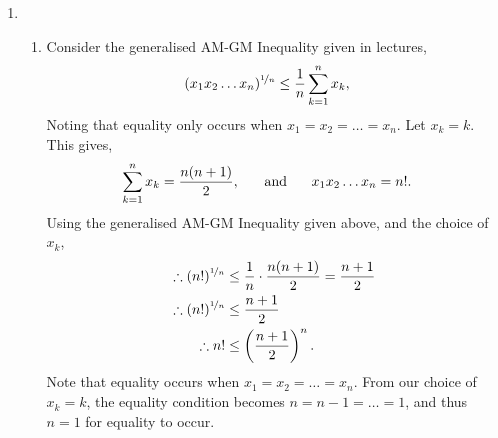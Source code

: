 \documentclass[a4paper,11pt]{article}
\newcommand{\ds}{\displaystyle}
\begin{document}
{{\begin{enumerate}[leftmargin=*]
\begin{enumerate}
				\item We have $\ds{f(x) \sim g(x)}$ as $\ds{x \rightarrow a}$, so 
					\begin{align*}
						\lim_{x \to a} \frac{f(x)}{g(x)} & = 1.
					\end{align*}
					Also, $\ds{h(x) = o(g(x)}$ as $\ds{x \rightarrow a}$, so
					\begin{align*}
						\lim_{x \to a} \frac{f(x)}{g(x)} & = 0.
					\end{align*}
					Considering the above two limits, we have
					\begin{align*}
						\lim_{x \to a}\left(\frac{f(x) + h(x)}{g(x)}\right) & = \lim_{x \to a}\left(\frac{f(x)}{g(x)} + \frac{h(x)}{g(x)}\right) = 1 + 0 = 0\\
					\end{align*}
					By definition, $\ds{f(x) + h(x) \sim g(x)}$.
					\bigbreak

				\item Consider $\ds{f(x) = x^3 + x^2 = O(x^4 + x)}$ and $\ds{g(x) = x^3 = O(x^4)}$. This gives $\ds{h(x) = x^4 + x}$ and $\ds{k(x) = x^4}$. Then $\ds{f(x) - g(x) = x^2}$, but $\ds{h(x) - k(x) = x}$. Clearly, $\ds{x^2 \neq O(x)}$, and so by counter-example, the assertion is false.
					\bigbreak
			\end{enumerate}

		\item 
			\begin{enumerate}
				\item Consider the generalised AM-GM Inequality given in lectures, 
					\begin{align*}
						(x_1x_2\dots x_n)^{\nicefrac{1}{n}} & \leq \frac{1}{n} \sum^n_{k=1} x_k,
					\end{align*}
					Noting that equality only occurs when $\ds{x_1 = x_2 = \dots = x_n}$. Let $\ds{x_k = k}$. This gives,
					\begin{align*}
						\sum^n_{k=1} x_k = \frac{n(n+1)}{2}, \hspace{5mm} \text{ and } & \hspace{5mm} x_1x_2\dots x_n = n!.
					\end{align*}
					Using the generalised AM-GM Inequality given above, and the choice of $\ds{x_k}$, 
					\begin{align*}
						\therefore (n!)^{\nicefrac{1}{n}} & \leq \frac{1}{n} \cdot \frac{n(n+1)}{2} = \frac{n+1}{2}\\
						\therefore (n!)^{\nicefrac{1}{n}} & \leq \frac{n+1}{2}\\
						\therefore n! & \leq \left(\frac{n+1}{2}\right)^n.
					\end{align*}
					Note that equality occurs when $\ds{x_1 = x_2 = \dots = x_n}$. From our choice of $\ds{x_k = k}$, the equality condition becomes $\ds{n = n-1 = \dots = 1}$, and thus $\ds{n = 1}$ for equality to occur.
					\bigbreak


\end{enumerate}
\end{enumerate}}}
\end{document}
